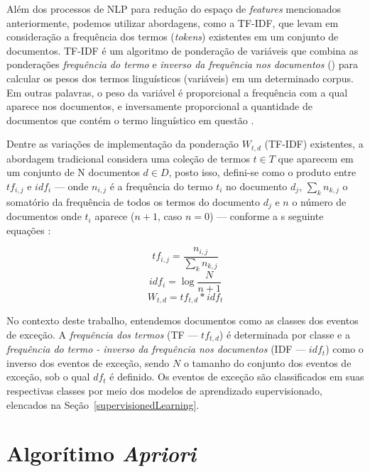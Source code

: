 \documentclass[
	12pt,				%
	oneside,			%
	a4paper,			%
	english,			%
	brazil				%
	]{abntex2ppgsi}
\begin{document}
{{{Além dos processos de NLP para redução do espaço de \textit{features} mencionados anteriormente, podemos utilizar abordagens, como a TF-IDF, que levam em consideração a frequência dos termos (\textit{tokens}) existentes em um conjunto de documentos. TF-IDF é um algoritmo de ponderação de variáveis que combina as ponderações \emph{frequência do termo}  e \emph{inverso da frequência nos documentos} () para calcular os pesos dos termos linguísticos (variáveis) em um determinado corpus. Em outras palavras, o peso da variável é proporcional a frequência com a qual aparece nos documentos, e inversamente proporcional a quantidade de documentos que contém o termo linguístico em questão \cite{wu2018improved, yahav2018comments}. 

Dentre as variações de implementação da ponderação $W_{t,d}$ (TF-IDF) existentes, a abordagem tradicional considera uma coleção de termos $t \in T$ que aparecem em um conjunto de N documentos $d \in D$, posto isso, defini-se como o produto entre $tf_{i,j}$ e $idf_i$ --- onde $n_{i,j}$ é a frequência do termo $t_i$ no documento $d_j$, $\sum_k n_{k,j}$ o somatório da frequência de todos os termos do documento $d_j$ e $n$ o número de documentos onde $t_i$ aparece ($n + 1$, caso $n = 0$) --- conforme a s seguinte equações \cite{wu2018improved}:

\begin{equation}
tf_{i,j} = \frac{n_{i,j}}{\sum_k n_{k,j}}
\end{equation}
\begin{equation}
idf_i = \log \frac{N}{n + 1}
\end{equation}
\begin{equation}
W_{t,d} = tf_{t,d} * idf_t
\end{equation}

No contexto deste trabalho, entendemos documentos como as classes dos eventos de exceção. A \emph{frequência dos termos} (TF --- $tf_{t,d}$) é determinada por classe e a \emph{frequência do termo - inverso da frequência nos documentos} (IDF --- $idf_t $) como o inverso dos eventos de exceção, sendo $N$ o tamanho do conjunto dos eventos de exceção, sob o qual $df_t$ é definido. Os eventos de exceção são classificados em suas respectivas classes por meio dos modelos de aprendizado supervisionado, elencados na Seção~\ref{supervisionedLearning}. 

\section{Algorítimo \textit{Apriori}}
\label{apriori}

}}}
\end{document}
